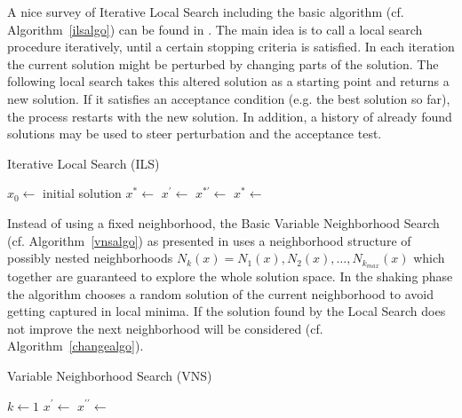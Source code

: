 A nice survey of Iterative Local Search including the basic algorithm (cf. Algorithm~\ref{ilsalgo}) can be found in \cite{lourencco2001iterated}. 
The main idea is to call a local search procedure iteratively, until a certain stopping criteria is satisfied. 
In each iteration the current solution might be perturbed by changing parts of the solution. 
The following local search takes this altered solution as a starting point and returns a new solution. 
If it satisfies an acceptance condition (e.g. the best solution so far), the process restarts with the new solution. 
In addition, a history of already found solutions may be used to steer perturbation and the acceptance test.
 
\begin{algorithm}
\caption{Iterative Local Search (ILS)}
\label{ilsalgo}
\begin{algorithmic} 
\State $x_0\gets$ initial solution
\State $x^*\gets$ 
\Repeat
\State $x^\prime \gets$ 
\State $x^{*\prime} \gets$ 
\State $x^* \gets$ 
\end{algorithmic}
\end{algorithm}

Instead of using a fixed neighborhood, the Basic Variable Neighborhood Search (cf. Algorithm~\ref{vnsalgo}) as presented in \cite{VNS} uses a neighborhood structure of possibly nested neighborhoods $N_k(x)=N_1(x),N_2(x),\dots,N_{k_{max}}(x)$ which together are guaranteed to explore the whole solution space. 
In the shaking phase the algorithm chooses a random solution of the current neighborhood to avoid getting captured in local minima. 
If the solution found by the Local Search does not improve the next neighborhood will be considered (cf. Algorithm~\ref{changealgo}).

\begin{algorithm}
\caption{Variable Neighborhood Search (VNS)}
\label{vnsalgo}
\begin{algorithmic}
\Repeat
\State $k \gets 1$
\Repeat
\State $x^{\prime} \gets$ 
\State $x^{\prime \prime}\gets$ 
\State {}
\EndFunction
\end{algorithmic}
\end{algorithm}

